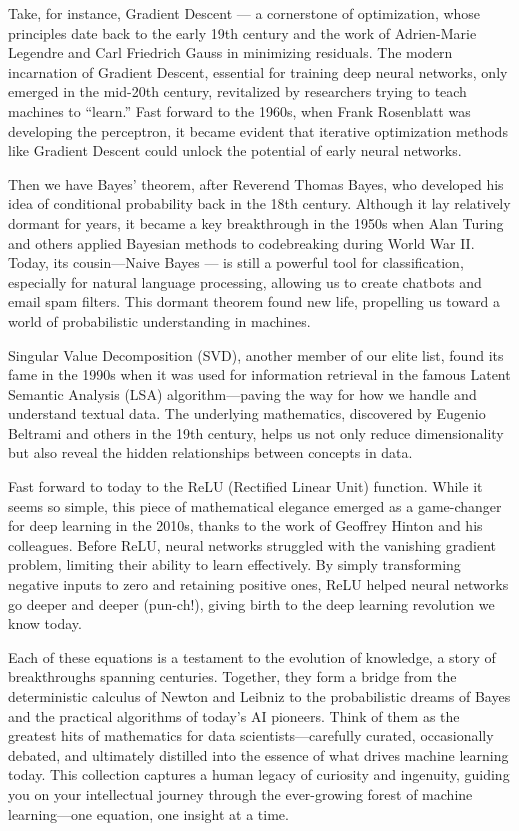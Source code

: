 \documentclass[
  12 pt,
  a4paper,
]{book}
\numberwithin{equation}{section}
\theoremstyle{plain}      %
\theoremstyle{definition} %
\theoremstyle{remark}     %
\theoremstyle{note}         %
\begin{document}
Take, for instance, Gradient Descent --- a cornerstone of optimization,
whose principles date back to the early 19th century and the work of
Adrien-Marie Legendre and Carl Friedrich Gauss in minimizing residuals.
The modern incarnation of Gradient Descent, essential for training deep
neural networks, only emerged in the mid-20th century, revitalized by
researchers trying to teach machines to ``learn.'' Fast forward to the
1960s, when Frank Rosenblatt was developing the perceptron, it became
evident that iterative optimization methods like Gradient Descent could
unlock the potential of early neural networks.

Then we have Bayes' theorem, after Reverend Thomas Bayes, who developed
his idea of conditional probability back in the 18th century. Although
it lay relatively dormant for years, it became a key breakthrough in the
1950s when Alan Turing and others applied Bayesian methods to
codebreaking during World War II. Today, its cousin---Naive Bayes --- is
still a powerful tool for classification, especially for natural
language processing, allowing us to create chatbots and email spam
filters. This dormant theorem found new life, propelling us toward a
world of probabilistic understanding in machines.

Singular Value Decomposition (SVD), another member of our elite list,
found its fame in the 1990s when it was used for information retrieval
in the famous Latent Semantic Analysis (LSA) algorithm---paving the way
for how we handle and understand textual data. The underlying
mathematics, discovered by Eugenio Beltrami and others in the 19th
century, helps us not only reduce dimensionality but also reveal the
hidden relationships between concepts in data.

Fast forward to today to the ReLU (Rectified Linear Unit) function.
While it seems so simple, this piece of mathematical elegance emerged as
a game-changer for deep learning in the 2010s, thanks to the work of
Geoffrey Hinton and his colleagues. Before ReLU, neural networks
struggled with the vanishing gradient problem, limiting their ability to
learn effectively. By simply transforming negative inputs to zero and
retaining positive ones, ReLU helped neural networks go deeper and
deeper (pun-ch!), giving birth to the deep learning revolution we know
today.

Each of these equations is a testament to the evolution of knowledge, a
story of breakthroughs spanning centuries. Together, they form a bridge
from the deterministic calculus of Newton and Leibniz to the
probabilistic dreams of Bayes and the practical algorithms of today's AI
pioneers. Think of them as the greatest hits of mathematics for data
scientists---carefully curated, occasionally debated, and ultimately
distilled into the essence of what drives machine learning today. This
collection captures a human legacy of curiosity and ingenuity, guiding
you on your intellectual journey through the ever-growing forest of
machine learning---one equation, one insight at a time.
\end{document}
